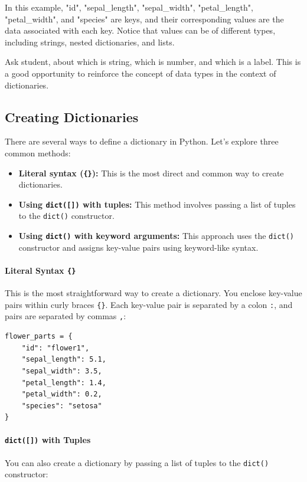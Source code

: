 In this example, "id", "sepal\_length", "sepal\_width", "petal\_length", "petal\_width", and "species" are keys, and their corresponding values are the data associated with each key. Notice that values can be of different types, including strings, nested dictionaries, and lists.

\begin{lectureronly}
Ask student, about which is string, which is number, and which is a label. This is a good opportunity to reinforce the concept of data types in the context of dictionaries.
\end{lectureronly}

\subsection{Creating Dictionaries}
\label{subsubsec:creating_dicts}
There are several ways to define a dictionary in Python. Let's explore three common methods:

\begin{itemize}
\item \textbf{Literal syntax (\texttt{\{\}}):} This is the most direct and common way to create dictionaries.
\item \textbf{Using \texttt{dict([])} with tuples:} This method involves passing a list of tuples to the \texttt{dict()} constructor.
\item \textbf{Using \texttt{dict()} with keyword arguments:} This approach uses the \texttt{dict()} constructor and assigns key-value pairs using keyword-like syntax.
\end{itemize}

\paragraph{Literal Syntax \texttt{\{\}}}
This is the most straightforward way to create a dictionary. You enclose key-value pairs within curly braces \texttt{\{\}}. Each key-value pair is separated by a colon \texttt{:}, and pairs are separated by commas \texttt{,}:

\begin{verbatim}
flower_parts = {
    "id": "flower1",
    "sepal_length": 5.1,
    "sepal_width": 3.5,
    "petal_length": 1.4,
    "petal_width": 0.2,
    "species": "setosa"
}
\end{verbatim}

\paragraph{\texttt{dict([])} with Tuples}
You can also create a dictionary by passing a list of tuples to the \texttt{dict()} constructor:

